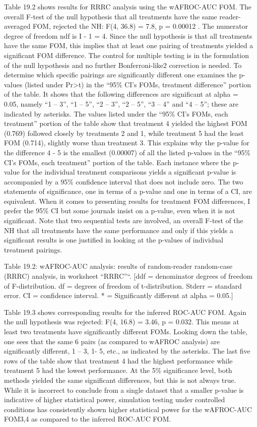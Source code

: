 \documentclass[
]{book}
\begin{document}
Table 19.2 shows results for RRRC analysis using the wAFROC-AUC FOM. The overall F-test of the null hypothesis that all treatments have the same reader-averaged FOM, rejected the NH: F(4, 36.8) = 7.8, p = 0.00012 . The numerator degree of freedom ndf is I - 1 = 4. Since the null hypothesis is that all treatments have the same FOM, this implies that at least one pairing of treatments yielded a significant FOM difference. The control for multiple testing is in the formulation of the null hypothesis and no further Bonferroni-like2 correction is needed. To determine which specific pairings are significantly different one examines the p-values (listed under Pr\textgreater t) in the ``95\% CI's FOMs, treatment difference'' portion of the table. It shows that the following differences are significant at alpha = 0.05, namely ``1 -- 3'', ``1 -- 5'', ``2 -- 3'', ``2 -- 5'', ``3 -- 4'' and ``4 -- 5''; these are indicated by asterisks. The values listed under the ``95\% CI's FOMs, each treatment'' portion of the table show that treatment 4 yielded the highest FOM (0.769) followed closely by treatments 2 and 1, while treatment 5 had the least FOM (0.714), slightly worse than treatment 3. This explains why the p-value for the difference 4 - 5 is the smallest (0.00007) of all the listed p-values in the ``95\% CI's FOMs, each treatment'' portion of the table. Each instance where the p-value for the individual treatment comparisons yields a significant p-value is accompanied by a 95\% confidence interval that does not include zero. The two statements of significance, one in terms of a p-value and one in terms of a CI, are equivalent. When it comes to presenting results for treatment FOM differences, I prefer the 95\% CI but some journals insist on a p-value, even when it is not significant. Note that two sequential tests are involved, an overall F-test of the NH that all treatments have the same performance and only if this yields a significant results is one justified in looking at the p-values of individual treatment pairings.

Table 19.2: wAFROC-AUC analysis: results of random-reader random-case (RRRC) analysis, in worksheet ``RRRC''``. {[}ddf = denominator degrees of freedom of F-distribution. df = degrees of freedom of t-distribution. Stderr = standard error. CI = confidence interval. * = Significantly different at alpha = 0.05.{]}

Table 19.3 shows corresponding results for the inferred ROC-AUC FOM. Again the null hypothesis was rejected: F(4, 16.8) = 3.46, p = 0.032. This means at least two treatments have significantly different FOMs. Looking down the table, one sees that the same 6 pairs (as compared to wAFROC analysis) are significantly different, 1 -- 3, 1- 5, etc., as indicated by the asterisks. The last five rows of the table show that treatment 4 had the highest performance while treatment 5 had the lowest performance. At the 5\% significance level, both methods yielded the same significant differences, but this is not always true. While it is incorrect to conclude from a single dataset that a smaller p-value is indicative of higher statistical power, simulation testing under controlled conditions has consistently shown higher statistical power for the wAFROC-AUC FOM3,4 as compared to the inferred ROC-AUC FOM.
\end{document}
